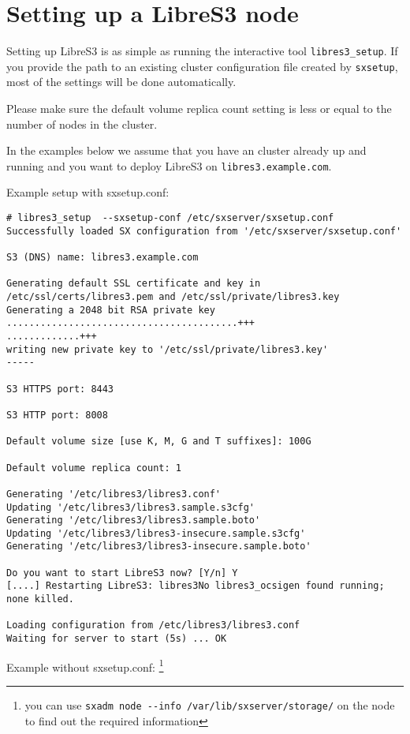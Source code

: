 \section{Setting up a LibreS3 node}

Setting up LibreS3 is as simple as running the interactive tool \verb+libres3_setup+.
If you provide the path to an existing \SX cluster configuration file created
by \verb+sxsetup+, most of the settings will be done automatically.

Please make sure the default volume replica count setting is less or equal
to the number of nodes in the \SX cluster.

In the examples below we assume that you
have an \SX cluster already up and running and you want to deploy
LibreS3 on \verb|libres3.example.com|.

Example setup with sxsetup.conf:

\begin{lstlisting}
# libres3_setup  --sxsetup-conf /etc/sxserver/sxsetup.conf
Successfully loaded SX configuration from '/etc/sxserver/sxsetup.conf'

S3 (DNS) name: libres3.example.com

Generating default SSL certificate and key in /etc/ssl/certs/libres3.pem and /etc/ssl/private/libres3.key
Generating a 2048 bit RSA private key
.........................................+++
.............+++
writing new private key to '/etc/ssl/private/libres3.key'
-----

S3 HTTPS port: 8443

S3 HTTP port: 8008

Default volume size [use K, M, G and T suffixes]: 100G

Default volume replica count: 1

Generating '/etc/libres3/libres3.conf'
Updating '/etc/libres3/libres3.sample.s3cfg'
Generating '/etc/libres3/libres3.sample.boto'
Updating '/etc/libres3/libres3-insecure.sample.s3cfg'
Generating '/etc/libres3/libres3-insecure.sample.boto'

Do you want to start LibreS3 now? [Y/n] Y
[....] Restarting LibreS3: libres3No libres3_ocsigen found running; none killed.

Loading configuration from /etc/libres3/libres3.conf
Waiting for server to start (5s) ... OK
\end{lstlisting}


Example without sxsetup.conf:
\footnote{you can use \texttt{sxadm node -{}-info /var/lib/sxserver/storage/} on the \SX node to find out the required information}

